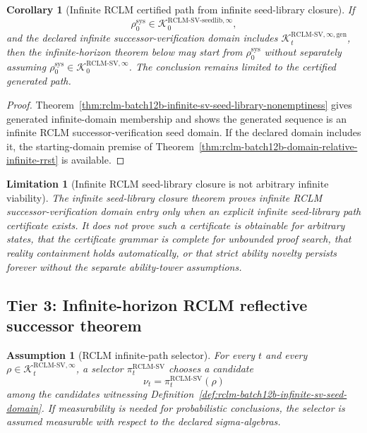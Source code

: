 \documentclass[11pt,a4paper]{article}
\newtheorem{corollary}[theorem]{Corollary}
\newtheorem{assumption}[theorem]{Assumption}
\newtheorem{limitation}[theorem]{Limitation}
\newcommand{\Kcal}{\mathcal K}
\newcommand{\RCLM}{\mathrm{RCLM}}
\newcommand{\sys}{\mathrm{sys}}
\begin{document}
\begin{corollary}[Infinite RCLM certified path from infinite seed-library closure]
\label{cor:rclm-batch12b-infinite-certified-path-from-seedlib}
If
\[
\rho_0^{\sys}\in\Kcal_0^{\RCLM\text{-}\mathrm{SV\mbox{-}seedlib},\infty},
\]
and the declared infinite successor-verification domain includes \(\Kcal_t^{\RCLM\text{-}\mathrm{SV},\infty,\mathrm{gen}}\), then the infinite-horizon theorem below may start from \(\rho_0^{\sys}\) without separately assuming \(\rho_0^{\sys}\in\Kcal_0^{\RCLM\text{-}\mathrm{SV},\infty}\). The conclusion remains limited to the certified generated path.
\end{corollary}

\begin{proof}
Theorem~\ref{thm:rclm-batch12b-infinite-sv-seed-library-nonemptiness} gives generated infinite-domain membership and shows the generated sequence is an infinite RCLM successor-verification seed domain. If the declared domain includes it, the starting-domain premise of Theorem~\ref{thm:rclm-batch12b-domain-relative-infinite-rrst} is available.
\end{proof}

\begin{limitation}[Infinite RCLM seed-library closure is not arbitrary infinite viability]
\label{lim:rclm-batch12b-infinite-seedlib-not-arbitrary-viability}
The infinite seed-library closure theorem proves infinite RCLM successor-verification domain entry only when an explicit infinite seed-library path certificate exists. It does not prove such a certificate is obtainable for arbitrary states, that the certificate grammar is complete for unbounded proof search, that reality containment holds automatically, or that strict ability novelty persists forever without the separate ability-tower assumptions.
\end{limitation}

\subsection{Tier 3: Infinite-horizon RCLM reflective successor theorem}

\begin{assumption}[RCLM infinite-path selector]
\label{ass:rclm-batch12b-infinite-path-selector}
For every \(t\) and every \(\rho\in\Kcal_t^{\RCLM\text{-}\mathrm{SV},\infty}\), a selector \(\pi_t^{\RCLM\text{-}\mathrm{SV}}\) chooses a candidate
\[
\nu_t=\pi_t^{\RCLM\text{-}\mathrm{SV}}(\rho)
\]
among the candidates witnessing Definition~\ref{def:rclm-batch12b-infinite-sv-seed-domain}. If measurability is needed for probabilistic conclusions, the selector is assumed measurable with respect to the declared sigma-algebras.
\end{assumption}
\end{document}
